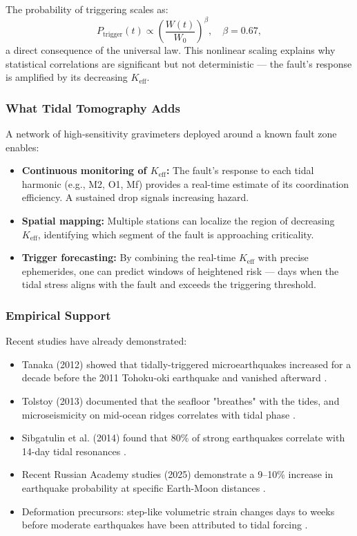 \documentclass[12pt,a4paper]{article}
\theoremstyle{remark}
\begin{document}
	The probability of triggering scales as:
	\[
	P_{\text{trigger}}(t) \propto \left( \frac{W(t)}{W_0} \right)^{\beta}, \quad \beta = 0.67,
	\]
	a direct consequence of the universal law. This nonlinear scaling explains why statistical correlations are significant but not deterministic — the fault's response is amplified by its decreasing \(K_{\mathrm{eff}}\).
	
	\subsubsection{What Tidal Tomography Adds}
	
	A network of high-sensitivity gravimeters deployed around a known fault zone enables:
	
	\begin{itemize}
		\item \textbf{Continuous monitoring of \(K_{\mathrm{eff}}\):} The fault's response to each tidal harmonic (e.g., M2, O1, Mf) provides a real-time estimate of its coordination efficiency. A sustained drop signals increasing hazard.
		\item \textbf{Spatial mapping:} Multiple stations can localize the region of decreasing \(K_{\mathrm{eff}}\), identifying which segment of the fault is approaching criticality.
		\item \textbf{Trigger forecasting:} By combining the real-time \(K_{\mathrm{eff}}\) with precise ephemerides, one can predict windows of heightened risk — days when the tidal stress aligns with the fault and exceeds the triggering threshold.
	\end{itemize}
	
	\subsubsection{Empirical Support}
	
	Recent studies have already demonstrated:
	
	\begin{itemize}
		\item Tanaka (2012) showed that tidally-triggered microearthquakes increased for a decade before the 2011 Tohoku-oki earthquake and vanished afterward \cite{Tanaka2012}.
		\item Tolstoy (2013) documented that the seafloor "breathes" with the tides, and microseismicity on mid-ocean ridges correlates with tidal phase \cite{Tolstoy2013}.
		\item Sibgatulin et al. (2014) found that 80\% of strong earthquakes correlate with 14-day tidal resonances \cite{Sibgatulin2014}.
		\item Recent Russian Academy studies (2025) demonstrate a 9–10\% increase in earthquake probability at specific Earth-Moon distances \cite{RAN2025}.
		\item Deformation precursors: step-like volumetric strain changes days to weeks before moderate earthquakes have been attributed to tidal forcing \cite{DeformationPrecursors2024}.
	\end{itemize}
	
\end{document}
